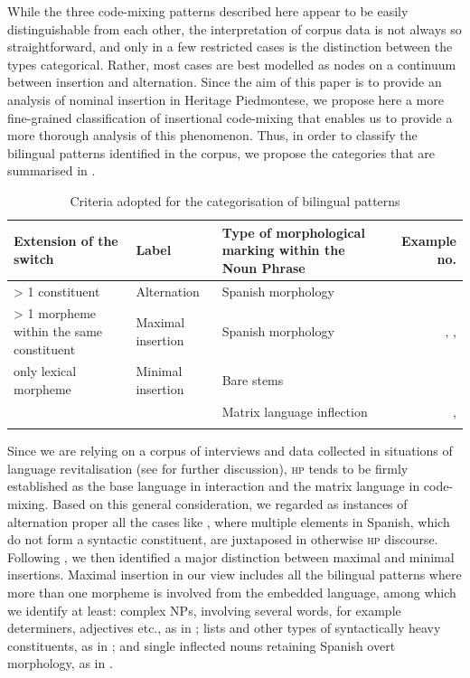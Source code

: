 \documentclass[output=paper]{langscibook}
\begin{document}
While the three code-mixing patterns described here appear to be easily distinguishable from each other, the interpretation of corpus data is not always so straightforward, and only in a few restricted cases is the distinction between the types categorical. Rather, most cases are best modelled as nodes on a continuum between insertion and alternation. Since the aim of this paper is to provide an analysis of nominal insertion in Heritage Piedmontese, we propose here a more fine-grained classification of insertional code-mixing that enables us to provide a more thorough analysis of this phenomenon. Thus, in order to classify the bilingual patterns identified in the corpus, we propose the categories that are summarised in .

\begin{table}
\begin{tabularx}{\textwidth}{QQQr}
\lsptoprule
Extension of the switch & Label & Type of morphological marking within the Noun Phrase & Example no.\\
\midrule
{ > 1 constituent} & { Alternation} & { Spanish morphology} & { }\\
{ > 1 morpheme within the same constituent} & { Maximal insertion} & { Spanish morphology} & { , , }\\
{ only lexical morpheme} & { Minimal insertion} & { Bare stems} & { }\\
&  & { Matrix language inflection} & { , }\\
\lspbottomrule
\end{tabularx}
\caption{Criteria adopted for the categorisation of bilingual patterns}
\label{tab:goria:1}
\end{table}

Since we are relying on a corpus of interviews and data collected in situations of language revitalisation (see  for further discussion), \textsc{hp} tends to be firmly established as the base language in interaction and the matrix language in code-mixing. Based on this general consideration, we regarded as instances of alternation proper all the cases like , where multiple elements in Spanish, which do not form a syntactic constituent, are juxtaposed in otherwise \textsc{hp} discourse. Following \citet{Auer2014}, we then identified a major distinction between maximal and minimal insertions. Maximal insertion in our view includes all the bilingual patterns where more than one morpheme is involved from the embedded language, among which we identify at least: complex NPs, involving several words, for example determiners, adjectives etc., as in ; lists and other types of syntactically heavy constituents, as in ; and single inflected nouns retaining Spanish overt morphology, as in .
\end{document}
